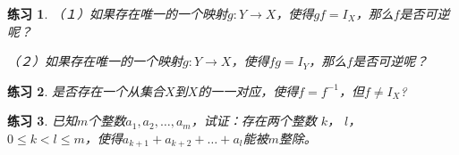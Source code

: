 \documentclass{book}[oneside]
\newtheorem{Exercise}{练习}[chapter]
\begin{document}
\begin{CJK*}{UTF8}{gbsn}
\begin{Exercise}
    （１）如果存在唯一的一个映射$g:Y\to X$，使得$gf = I_X$，那么$f$是否可逆呢？

    （２）如果存在唯一的一个映射$g:Y\to X$，使得$fg = I_Y$，那么$f$是否可逆呢？

  \end{Exercise}
  \begin{Exercise}
    是否存在一个从集合$X$到$X$的一一对应，使得$f=f^{-1}$，但$f \neq I_X$?
  \end{Exercise}

  \begin{Exercise}
    已知$m$个整数$a_1,a_2,\ldots,a_m$，试证：存在两个整数 $k$， $l$， \\ $0\leq k < l \leq m$，使得$a_{k+1}+a_{k+2}+\ldots+a_{l}$能被$m$整除。
  \end{Exercise}


\chapter{}

\end{CJK*}
\end{document}
